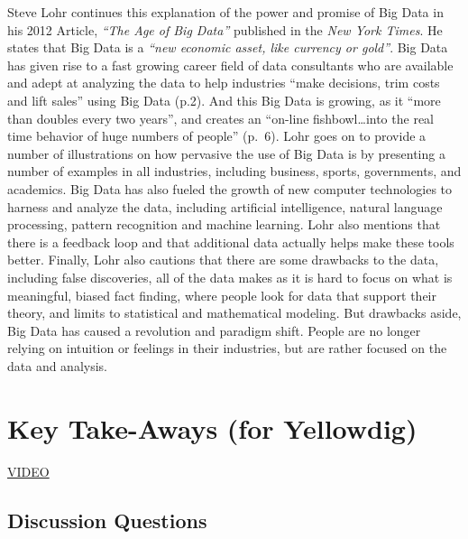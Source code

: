 \documentclass[]{book}
\begin{document}
Steve Lohr continues this explanation of the power and promise of Big Data in his 2012 Article, \emph{``The Age of Big Data''} published
in the \emph{New York Times}. He states that Big Data is a \emph{``new economic asset, like currency or gold''}. Big Data has given rise
to a fast growing career field of data consultants who are available and adept at analyzing the data to help industries ``make
decisions, trim costs and lift sales'' using Big Data (p.2). And this Big Data is growing, as it ``more than doubles every
two years'', and creates an ``on-line fishbowl\ldots{}into the real time behavior of huge numbers of people'' (p.~6).
Lohr goes on to provide a number of illustrations on how pervasive the use of Big Data is by presenting a number of
examples in all industries, including business, sports, governments, and academics. Big Data has also fueled the growth
of new computer technologies to harness and analyze the data, including artificial intelligence, natural language processing,
pattern recognition and machine learning. Lohr also mentions that there is a feedback loop and that additional data
actually helps make these tools better. Finally, Lohr also cautions that there are some drawbacks to the data, including
false discoveries, all of the data makes as it is hard to focus on what is meaningful, biased fact finding, where people
look for data that support their theory, and limits to statistical and mathematical modeling. But drawbacks aside,
Big Data has caused a revolution and paradigm shift. People are no longer relying on intuition or feelings in their industries,
but are rather focused on the data and analysis.

\hypertarget{key-take-aways-for-yellowdig}{%
\section{Key Take-Aways (for Yellowdig)}\label{key-take-aways-for-yellowdig}}

\href{https://voicethread.com/myvoice/thread/11963613/71077645/66681745}{VIDEO}

\hypertarget{discussion-questions}{%
\subsection{Discussion Questions}\label{discussion-questions}}
\end{document}
